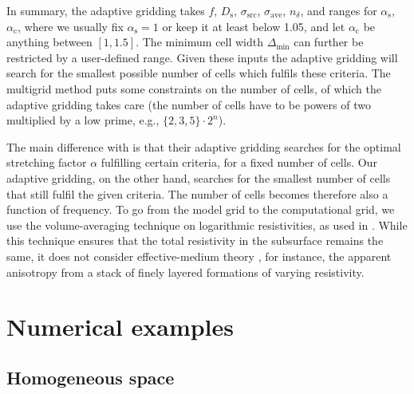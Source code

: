 \documentclass[onecolumn,extra,referee,camera]{gji}
\newcommand{\mr}[1]{\mathrm{#1}}
\newcommand{\emg}[2]{\texttt{emg#1#2}\xspace}
\begin{document}
In summary, the adaptive gridding takes $f$, $D_\mr{s}$, $\sigma_\mr{src}$,
$\sigma_\mr{ave}$, $n_\delta$, and ranges for $\alpha_\mr{s}$, $\alpha_\mr{c}$,
where we usually fix $\alpha_\mr{s}=1$ or keep it at least below 1.05, and let
$\alpha_\mr{c}$ be anything between $[1, 1.5]$. The minimum cell width
$\Delta_\mr{min}$ can further be restricted by a user-defined range. Given
these inputs the adaptive gridding will search for the smallest possible number
of cells which fulfils these criteria. The  multigrid method
\deleted{implemented in \emg3d} puts some constraints on the number of cells, of
which the adaptive gridding takes care (the number of cells have to be powers
of two multiplied by a low prime, e.g., $\{2,3,5\}\cdot2^n$).

The main difference with \cite{GEO.08.Mulder} is that their adaptive gridding
searches for the optimal stretching factor $\alpha$ fulfilling certain
criteria, for a fixed number of cells. Our adaptive gridding, on the other
hand, searches for the smallest number of cells that still fulfil the given
criteria. The number of cells becomes therefore also a function of frequency.
 To go from the model grid to the computational
grid, we use the volume-averaging technique on logarithmic resistivities, as
used in \cite{GEO.07.Plessix}. While this technique ensures that the total
resistivity in the subsurface remains the same, it does not consider
effective-medium theory \citep{GEO.03.Davydycheva}, for instance, the apparent
anisotropy from a stack of finely layered formations of varying resistivity.


\section{Numerical examples}  %


\subsection{Homogeneous space}  %
\end{document}
